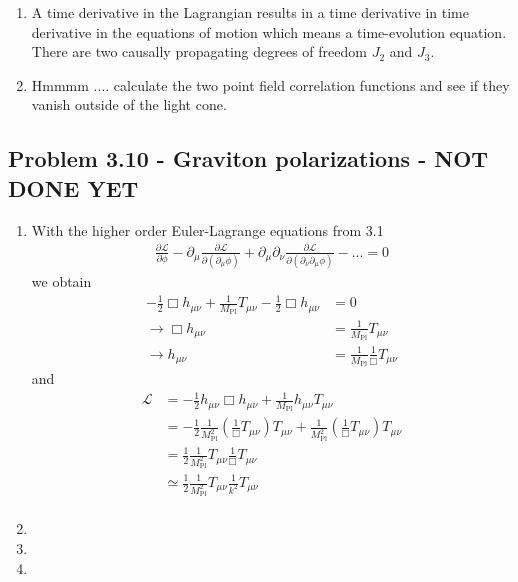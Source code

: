 \documentclass[../main.tex]{subfiles}
\begin{document}
\begin{enumerate}[label=(\alph*)]
\item A time derivative in the Lagrangian results in a time derivative in time derivative in the equations of motion which means a time-evolution equation. There are two causally propagating degrees of freedom $J_2$ and $J_3$.

\item Hmmmm .... calculate the two point field correlation functions and see if they vanish outside of the light cone.

\end{enumerate}


\subsection{Problem 3.10 - Graviton polarizations - NOT DONE YET}
\begin{enumerate}[label=(\alph*)]
\item With the higher order Euler-Lagrange equations from 3.1
\begin{align}
\frac{\partial \mathcal{L}}{\partial\phi}
- \partial_\mu\frac{\partial \mathcal{L}}{\partial(\partial_\mu\phi)}
+\partial_\mu\partial_\nu\frac{\partial \mathcal{L}}{\partial(\partial_\nu\partial_\mu\phi)}-...=0
\end{align}
we obtain
\begin{align}
-\frac{1}{2}\Box h_{\mu\nu}+\frac{1}{M_\text{Pl}}T_{\mu\nu}-\frac{1}{2}\Box h_{\mu\nu}&=0\\
\rightarrow \Box h_{\mu\nu}&=\frac{1}{M_\text{Pl}}T_{\mu\nu}\\
\rightarrow h_{\mu\nu}&=\frac{1}{M_\text{Pl}}\frac{1}{\Box}T_{\mu\nu}
\end{align}
and
\begin{align}
\mathcal{L}
&=-\frac{1}{2}h_{\mu\nu}\Box h_{\mu\nu}+\frac{1}{M_\text{Pl}}h_{\mu\nu}T_{\mu\nu}\\
&=-\frac{1}{2}\frac{1}{M_\text{Pl}^2}(\frac{1}{\Box} T_{\mu\nu})T_{\mu\nu}+\frac{1}{M_\text{Pl}^2}(\frac{1}{\Box} T_{\mu\nu})T_{\mu\nu}\\
&=\frac{1}{2}\frac{1}{M_\text{Pl}^2}T_{\mu\nu}\frac{1}{\Box} T_{\mu\nu}\\
&\simeq\frac{1}{2}\frac{1}{M_\text{Pl}^2}T_{\mu\nu}\frac{1}{k^2} T_{\mu\nu}\\
\end{align}
\item
\item
\item
\end{enumerate}
\end{document}
